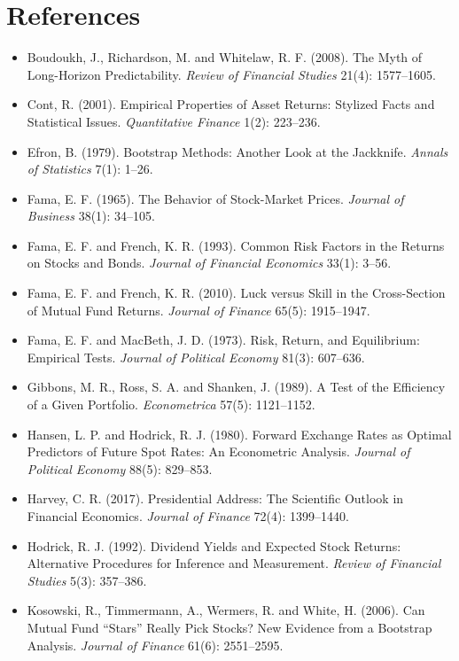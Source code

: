\section*{References}

\begin{itemize}
  \item Boudoukh, J., Richardson, M. and Whitelaw, R. F. (2008). The Myth of Long-Horizon Predictability. \emph{Review of Financial Studies} 21(4): 1577--1605.
  \item Cont, R. (2001). Empirical Properties of Asset Returns: Stylized Facts and Statistical Issues. \emph{Quantitative Finance} 1(2): 223--236.
  \item Efron, B. (1979). Bootstrap Methods: Another Look at the Jackknife. \emph{Annals of Statistics} 7(1): 1--26.
  \item Fama, E. F. (1965). The Behavior of Stock-Market Prices. \emph{Journal of Business} 38(1): 34--105.
  \item Fama, E. F. and French, K. R. (1993). Common Risk Factors in the Returns on Stocks and Bonds. \emph{Journal of Financial Economics} 33(1): 3--56.
  \item Fama, E. F. and French, K. R. (2010). Luck versus Skill in the Cross-Section of Mutual Fund Returns. \emph{Journal of Finance} 65(5): 1915--1947.
  \item Fama, E. F. and MacBeth, J. D. (1973). Risk, Return, and Equilibrium: Empirical Tests. \emph{Journal of Political Economy} 81(3): 607--636.
  \item Gibbons, M. R., Ross, S. A. and Shanken, J. (1989). A Test of the Efficiency of a Given Portfolio. \emph{Econometrica} 57(5): 1121--1152.
  \item Hansen, L. P. and Hodrick, R. J. (1980). Forward Exchange Rates as Optimal Predictors of Future Spot Rates: An Econometric Analysis. \emph{Journal of Political Economy} 88(5): 829--853.
  \item Harvey, C. R. (2017). Presidential Address: The Scientific Outlook in Financial Economics. \emph{Journal of Finance} 72(4): 1399--1440.
  \item Hodrick, R. J. (1992). Dividend Yields and Expected Stock Returns: Alternative Procedures for Inference and Measurement. \emph{Review of Financial Studies} 5(3): 357--386.
  \item Kosowski, R., Timmermann, A., Wermers, R. and White, H. (2006). Can Mutual Fund ``Stars'' Really Pick Stocks? New Evidence from a Bootstrap Analysis. \emph{Journal of Finance} 61(6): 2551--2595.

\end{itemize}

